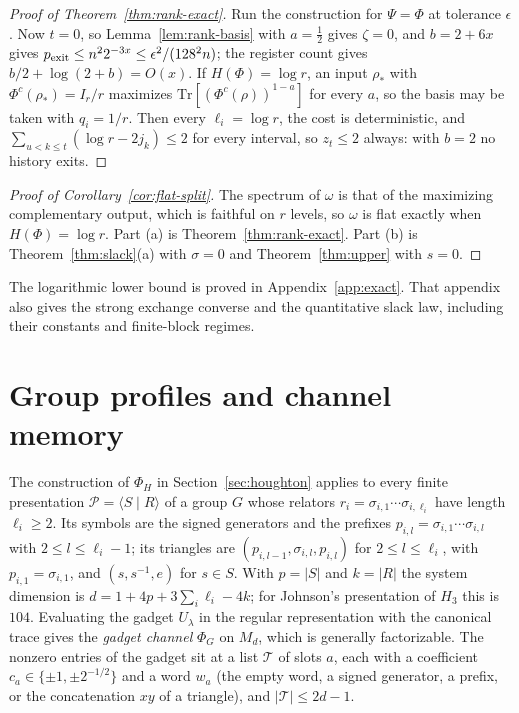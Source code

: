 \documentclass[11pt,a4paper]{article}
\theoremstyle{plain}
\theoremstyle{definition}
\theoremstyle{remark}
\begin{document}
\begin{proof}[Proof of Theorem~\ref{thm:rank-exact}]
Run the construction for $\Psi=\Phi$ at tolerance $\epsilon$. Now $t=0$, so Lemma~\ref{lem:rank-basis} with $a=\frac12$ gives $\zeta=0$, and $b=2+6x$ gives
$p_{\rm exit}\le n^22^{-3x}\le\epsilon^2/(128^2n)$; the register count gives $b/2+\log(2+b)=O(x)$. If $H(\Phi)=\log r$, an input $\rho_*$ with $\Phi^c(\rho_*)=I_r/r$
maximizes $\mathrm{Tr}[(\Phi^c(\rho))^{1-a}]$ for every $a$, so the basis may be taken with $q_i=1/r$. Then every $\ell_i=\log r$, the cost is deterministic, and
$\sum_{u<k\le t}(\log r-2j_k)\le2$ for every interval, so $z_t\le2$ always: with $b=2$ no history exits.
\end{proof}

\begin{proof}[Proof of Corollary~\ref{cor:flat-split}]
The spectrum of $\omega$ is that of the maximizing complementary output, which is faithful on $r$ levels, so $\omega$ is flat exactly when $H(\Phi)=\log r$. Part (a)
is Theorem~\ref{thm:rank-exact}. Part (b) is Theorem~\ref{thm:slack}(a) with $\sigma=0$ and Theorem~\ref{thm:upper} with $s=0$.
\end{proof}


The logarithmic lower bound is proved in Appendix~\ref{app:exact}.
That appendix also gives the strong exchange converse and the quantitative
slack law, including their constants and finite-block regimes.


\section{Group profiles and channel memory}\label{sec:res-group}


The construction of $\Phi_H$ in Section~\ref{sec:houghton} applies to every finite presentation $\mathcal P=\langle S\mid R\rangle$ of a group $G$ whose
relators $r_i=\sigma_{i,1}\cdots\sigma_{i,\ell_i}$ have length $\ell_i\ge2$. Its symbols are the signed generators and the prefixes
$p_{i,l}=\sigma_{i,1}\cdots\sigma_{i,l}$ with $2\le l\le\ell_i-1$; its triangles are $(p_{i,l-1},\sigma_{i,l},p_{i,l})$ for $2\le l\le\ell_i$, with $p_{i,1}=\sigma_{i,1}$,
and $(s,s^{-1},e)$ for $s\in S$. With $p=|S|$ and $k=|R|$ the system dimension is $d=1+4p+3\sum_i\ell_i-4k$; for Johnson's presentation of $H_3$ this is
$104$. Evaluating the gadget $U_\lambda$ in the regular representation with the canonical trace gives the \emph{gadget channel} $\Phi_G$ on $M_d$, which
is generally factorizable. The nonzero entries of the gadget sit at a list $\mathcal T$ of slots $a$, each with a coefficient $c_a\in\{\pm1,\pm2^{-1/2}\}$ and
a word $w_a$ (the empty word, a signed generator, a prefix, or the concatenation $xy$ of a triangle), and $|\mathcal T|\le2d-1$.
\end{document}
